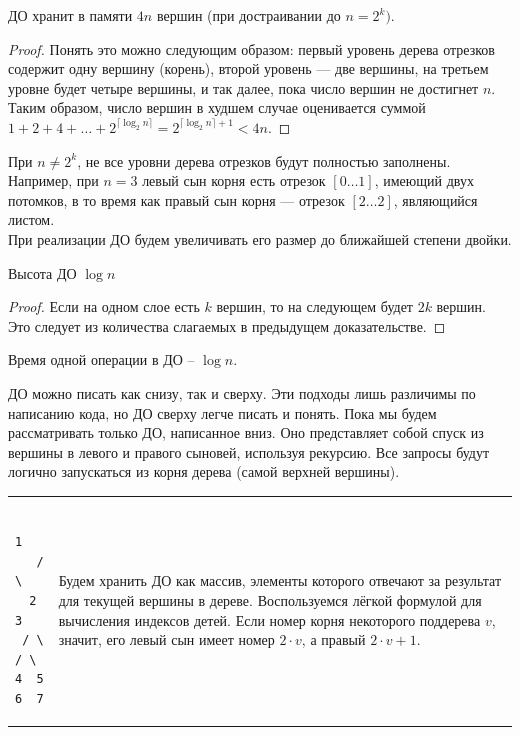 \begin{Thm}\label{thm@splay}
ДО хранит в памяти $4n$ вершин (при достраивании до $n=2^k)$.\end{Thm}
\begin{proof}
Понять это можно следующим образом: первый уровень дерева отрезков содержит одну вершину (корень), второй уровень — две вершины, на третьем уровне будет четыре вершины, и так далее, пока число вершин не достигнет $n$. Таким образом, число вершин в худшем случае оценивается суммой 
$1 + 2 + 4 + \dots + 2^{\lceil\log_2 n\rceil} = 2^{\lceil\log_2 n\rceil + 1} < 4n$.
\end{proof}

\begin{Rem}При $n \ne 2^k$, не все уровни дерева отрезков будут полностью заполнены. Например, при $n=3$ левый сын корня есть отрезок $[0 \ldots 1]$, имеющий двух потомков, в то время как правый сын корня — отрезок $[2 \ldots 2]$, являющийся листом. \\
При реализации ДО будем увеличивать его размер до ближайшей степени двойки.
\end{Rem}

\begin{Thm}\label{thm@splay}
Высота ДО $\log n$\end{Thm}
\begin{proof}
Если на одном слое есть $k$ вершин, то на следующем будет $2k$ вершин.
Это следует из количества слагаемых в предыдущем доказательстве.
\end{proof}

\begin{Cons}Время одной операции в ДО -- $\log n$.\end{Cons}

\pagebreak
\up\up\up
{}

ДО можно писать как снизу, так и сверху. Эти подходы лишь различимы по написанию кода, но ДО сверху легче писать и понять. Пока мы будем рассматривать только ДО, написанное { вниз}. Оно представляет собой спуск из вершины в левого и правого сыновей, используя рекурсию. Все запросы будут логично запускаться из корня дерева (самой верхней вершины).

\down
\begin{tabular}{m{}m{}}
	\begin{minipage}{\textwidth}
\begin{verbatim}
    1  
   / \
  2   3
 / \ / \
4  5 6  7      
\end{verbatim}
	\end{minipage} 
	&
Будем хранить ДО как массив, элементы которого отвечают за результат для текущей вершины в дереве.
Воспользуемся лёгкой формулой для вычисления индексов детей. Если номер корня некоторого поддерева $v$, значит, его левый сын имеет номер $2 \cdot v$, а правый $2 \cdot v + 1$.
\end{tabular}
\down

